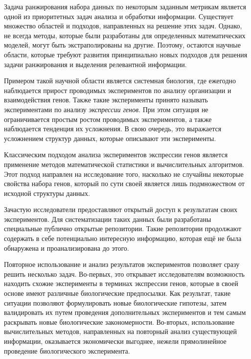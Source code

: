 
{\actuality} Задача ранжирования набора данных по некоторым заданным метрикам является одной из приоритетных задач анализа и обработки информации.
Существует множество областей и подходов, направленных на решение этих задач.
Однако, не всегда методы, которые были разработаны для определенных математических моделей, могут быть экстраполированы на другие.
Поэтому, остаются научные области, которые требуют развития принципиально новых подходов для решения задачи ранжирования и выделения релевантной информации.


Примером такой научной области является системная биология, где ежегодно наблюдается прирост проводимых экспериментов по анализу организации и взаимодействия генов.
Также такие эксперименты принято называть экспериментами по анализу \textit{экспрессии генов}.
При этом ситуация не ограничивается простым ростом проводимых экспериментов, а также наблюдается тенденция их усложнения.
В свою очередь, это выражается усложнением структур данных, которые описывают эти эксперименты.

Классическим подходом анализа экспериментов экспрессии генов является применение методов математической статистики и вычислительных алгоритмов.
Этот подход направлен на исследование того, насколько не случайны некоторые свойства набора генов, который по сути своей является лишь подмножеством от исходной структуры данных.


Зачастую исследователи предоставляют открытый доступ к результатам своих экспериментов.
Для систематизации таких данных были разработаны специальные публично открытые репозитории.
Такие репозитории продолжают содержать в себе потенциально интересную информацию, которая ещё не была обнаружена и проанализирована до этого.

Повторное использование и анализ результатов экспериментов позволяет сразу решить несколько задач.
Во-первых, это открывает исследователям возможность находить схожие эксперименты в терминах экспрессии генов, которые в своей основе имеют различные биологические предпосылки.
Как результат, такие ситуации позволяют формулировать новые биологические гипотезы, затем валидировать их путем проведения дополнительных экспериментов и тем самым раскрывать новые биологические закономерности.
Во-вторых, использование вычислительных методов, направленных на повторный анализ существующей информации, оказывается экономически выгоднее, нежели прямолинейное проведение биологического эксперимента.



